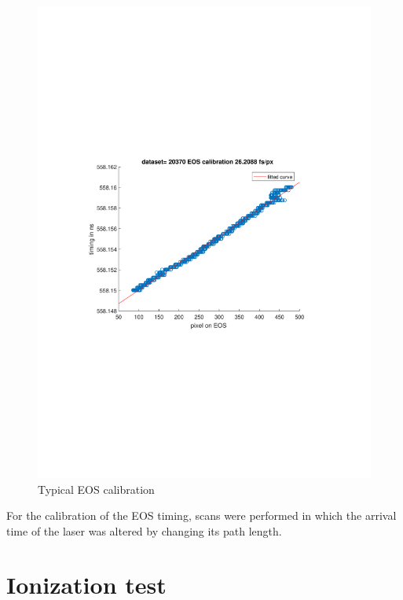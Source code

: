 \begin{figure}
\includegraphics[width=1.0\textwidth]{experiment/images/raw/20370_EOS_calibration.pdf}
\caption{Typical EOS calibration}
\label{img:EOS_Calib}
\end{figure}
For the calibration of the EOS timing, scans were performed in which the arrival time of the laser was altered by changing its
path length. 

\newpage
\section{Ionization test}
